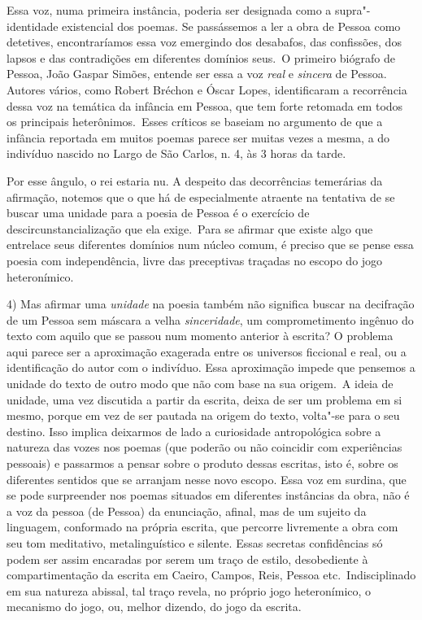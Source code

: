 Essa voz, numa primeira instância, poderia ser designada como a
supra"-identidade existencial dos poemas. Se passássemos a ler a obra de
Pessoa como detetives, encontraríamos essa voz emergindo dos desabafos,
das confissões, dos lapsos e das contradições em diferentes domínios
seus.~O primeiro biógrafo de Pessoa, João Gaspar Simões, entende ser
essa a voz \emph{real} e \emph{sincera} de Pessoa. Autores vários, como
Robert Bréchon e Óscar Lopes, identificaram a recorrência dessa voz na temática da infância em Pessoa, que tem forte retomada em todos os
principais heterônimos.~Esses críticos se baseiam no argumento de que a
infância reportada em muitos poemas parece ser muitas vezes a mesma, a
do indivíduo nascido no Largo de São Carlos, n. 4, às 3 horas da tarde.

Por esse ângulo, o rei estaria nu. A despeito das decorrências
temerárias da afirmação, notemos que o que há de especialmente atraente
na tentativa de se buscar uma unidade para a poesia de Pessoa é o
exercício de descircunstancialização que ela exige.~Para se afirmar que
existe algo que entrelace seus diferentes domínios num núcleo comum, é
preciso que se pense essa poesia com independência, livre das
preceptivas traçadas no escopo do jogo heteronímico.

4) Mas afirmar uma \emph{unidade} na poesia também não significa buscar
na decifração de um Pessoa sem máscara a velha \emph{sinceridade}, um
comprometimento ingênuo do texto com aquilo que se passou num momento
anterior à escrita? O problema aqui parece ser a aproximação exagerada
entre os universos ficcional e real, ou a identificação do autor com o
indivíduo. Essa aproximação impede que pensemos a unidade do texto de
outro modo que não com base na sua origem.~A ideia de unidade, uma vez
discutida a partir da escrita, deixa de ser um problema em si mesmo,
porque em vez de ser pautada na origem do texto, volta"-se para o seu
destino. Isso implica deixarmos de lado a curiosidade antropológica
sobre a natureza das vozes nos poemas (que poderão ou não coincidir com
experiências pessoais) e passarmos a pensar sobre o produto dessas
escritas, isto é, sobre os diferentes sentidos que se arranjam nesse
novo escopo. Essa voz em surdina, que se pode surpreender nos poemas
situados em diferentes instâncias da obra, não é a voz da pessoa (de
Pessoa) da enunciação, afinal, mas de um sujeito da linguagem,
conformado na própria escrita, que percorre livremente a obra com seu
tom meditativo, metalinguístico e silente. Essas secretas confidências
só podem ser assim encaradas por serem um traço de estilo, desobediente
à compartimentação da escrita em Caeiro, Campos, Reis, Pessoa etc.~Indisciplinado em sua natureza abissal, tal traço revela, no próprio
jogo heteronímico, o mecanismo do jogo, ou, melhor dizendo, do jogo da
escrita.


